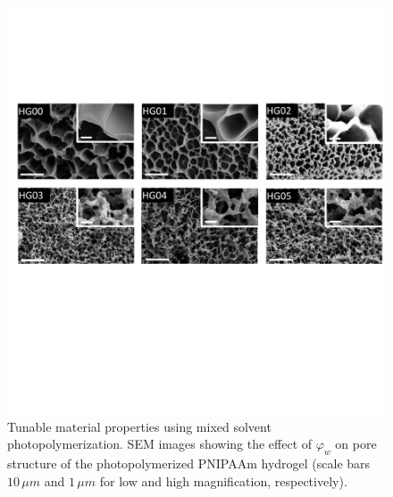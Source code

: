 \begin{figure}[!ht]
\centering
\includegraphics[width=\textwidth]{sem.pdf}
\caption[The effect of $\varphi_w$ on pore structure]{Tunable material properties using mixed solvent photopolymerization.
SEM images showing the effect of $\varphi_w$ on pore structure of the photopolymerized PNIPAAm hydrogel (scale bars $10\,\mu m$ and $1\,\mu m$ for low and high magnification, respectively).}
\label{fig:sem}
\end{figure}

